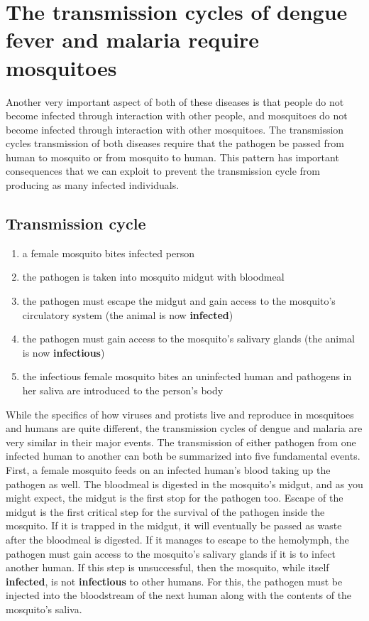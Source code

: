 \section{The transmission cycles of dengue fever and malaria require mosquitoes}

Another very important aspect of both of these diseases is that people do not become infected through interaction with other people, and mosquitoes do not become infected through interaction with other mosquitoes.
The transmission cycles transmission of both diseases require that the pathogen be passed from human to mosquito or from mosquito to human.
This pattern has important consequences that we can exploit to prevent the transmission cycle from producing as many infected individuals.

\subsection{Transmission cycle}

\begin{enumerate}
\item a female mosquito bites infected person
\item the pathogen is taken into mosquito midgut with bloodmeal
\item the pathogen must escape the midgut and gain access to the mosquito's circulatory system (the animal is now \textbf{infected})
\item the pathogen must gain access to the mosquito's salivary glands (the animal is now \textbf{infectious})
\item the infectious female mosquito bites an uninfected human and pathogens in her saliva are introduced to the person's body
\end{enumerate}
While the specifics of how viruses and protists live and reproduce in mosquitoes and humans are quite different, the transmission cycles of dengue and malaria are very similar in their major events.
The transmission of either pathogen from one infected human to another can both be summarized into five fundamental events.
First, a female mosquito feeds on an infected human's blood taking up the pathogen as well.
The bloodmeal is digested in the mosquito's midgut, \alert{and as you might expect, the midgut is the first stop for the pathogen too.}
Escape of the midgut is the first critical step for the survival of the pathogen inside the mosquito.
If it is trapped in the midgut, it will eventually be passed as waste after the bloodmeal is digested.
If it manages to escape to the \gls{hemolymph}, the pathogen must gain access to the mosquito's salivary glands if it is to infect another human.
If this step is unsuccessful, then the mosquito, while itself \textbf{infected}, is not \textbf{infectious} to other humans.
For this, the pathogen must be injected into the bloodstream of the next human along with the contents of the mosquito's saliva.


